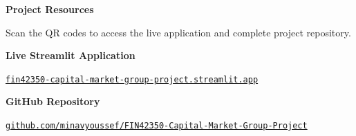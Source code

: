 \documentclass[11pt,a4paper]{article}
\begin{document}
\clearpage
\thispagestyle{empty}
\begin{center}
  \vspace*{1cm}
  {\Huge\bfseries Project Resources\par}
  \vspace{0.4cm}
  {\large Scan the QR codes to access the live application and complete project repository.\par}

  \vspace{1.3cm}
  {\Large\bfseries Live Streamlit Application\par}
  \vspace{0.45cm}
  {\color{black}}
  \vspace{0.35cm}

  \href{https://fin42350-capital-market-group-project.streamlit.app}{\texttt{fin42350-capital-market-group-project.streamlit.app}}

  \vspace{1.2cm}
  {\Large\bfseries GitHub Repository\par}
  \vspace{0.45cm}
  {\color{black}}
  \vspace{0.35cm}

  \href{https://github.com/minavyoussef/FIN42350-Capital-Market-Group-Project}{\texttt{github.com/minavyoussef/FIN42350-Capital-Market-Group-Project}}
\end{center}

\clearpage
\hypersetup{pageanchor=true}
\begingroup
  \footnotesize
  \setlength{\parskip}{0pt}
  \tableofcontents
\endgroup

\clearpage
{}

\begin{abstract}
  This report develops a systematic framework for constructing a multi-asset portfolio based on an investor specific preference. The frame has been designed into five phases using in-sample historical data for portfolio allocation and out-of-sample data for the optimised portfolio performance evaluation. In addition, we use Monte Carlo simulation future expected return under three different investor profiles, risky, balanced, and conservative with SPY as a proxy for market benchmark.
\end{abstract}
\newpage
\end{document}
